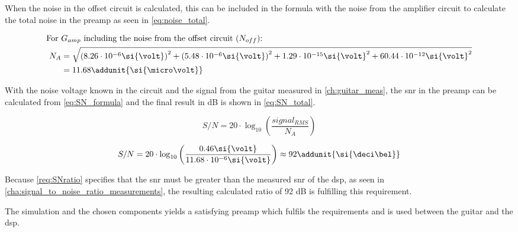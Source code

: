 When the noise in the offset circuit is calculated, this can be included in the formula with the noise from the amplifier circuit to calculate the total noise in the \gls{preamp} as seen in \autoref{eq:noise_total}.


\begin{align}
	\text{For } &G_{amp}\text{ including the noise from the offset circuit ($N_{off}$): } \nonumber \\
	N_A &= \sqrt{\left(8.26 \cdot 10^{-6}\si{\volt}\right)^2 + \left( 5.48 \cdot 10^{-6}\si{\volt} \right) ^2+ 1.29 \cdot 10^{-15}\si{\volt}^2 + 60.44 \cdot 10^{-12}\si{\volt}^2} \nonumber \\
	&= 11.68 \label{eq:noise_total}
	\addunit{\si{\micro\volt}}
\end{align}


With the noise voltage known in the circuit and the signal from the guitar measured in \autoref{ch:guitar_meas}, the \gls{snr} in the \gls{preamp} can be calculated from \autoref{eq:SN_formula} and the final result in \si{\deci\bel} is shown in \autoref{eq:SN_total}.


\begin{equation}\label{eq:SN_formula}
	S/N = 20 \cdot \log_{10} \left( \frac{signal_{RMS}}{N_A} \right)
\end{equation}

\startexplain
\stopexplain



\begin{equation}\label{eq:SN_total}
	S/N = 20 \cdot \log_{10} \left( \frac{0.46\si{\volt}}{11.68 \cdot 10^{-6}\si{\volt}} \right) \approx 92 
	\addunit{\si{\deci\bel}}
\end{equation}

Because \autoref{req:SNratio} specifies that the \gls{snr} must be greater than the measured \gls{snr} of the \gls{dsp}, as seen in \autoref{cha:signal_to_noise_ratio_measurements}, the resulting calculated ratio of 92 dB is fulfilling this requirement. 

The simulation and the chosen components yields a satisfying \gls{preamp} which fulfils the requirements and is used between the guitar and the \gls{dsp}.
